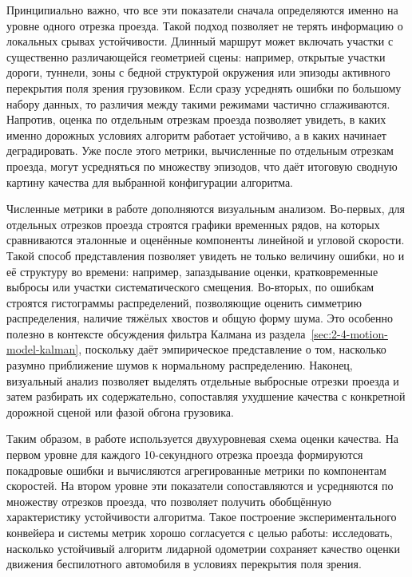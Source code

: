 Принципиально важно, что все эти показатели сначала определяются именно на уровне одного отрезка проезда. Такой подход позволяет не терять информацию о локальных срывах устойчивости. Длинный маршрут может включать участки с существенно различающейся геометрией сцены: например, открытые участки дороги, туннели, зоны с бедной структурой окружения или эпизоды активного перекрытия поля зрения грузовиком. Если сразу усреднять ошибки по большому набору данных, то различия между такими режимами частично сглаживаются. Напротив, оценка по отдельным отрезкам проезда позволяет увидеть, в каких именно дорожных условиях алгоритм работает устойчиво, а в каких начинает деградировать. Уже после этого метрики, вычисленные по отдельным отрезкам проезда, могут усредняться по множеству эпизодов, что даёт итоговую сводную картину качества для выбранной конфигурации алгоритма.

Численные метрики в работе дополняются визуальным анализом. Во-первых, для отдельных отрезков проезда строятся графики временных рядов, на которых сравниваются эталонные и оценённые компоненты линейной и угловой скорости. Такой способ представления позволяет увидеть не только величину ошибки, но и её структуру во времени: например, запаздывание оценки, кратковременные выбросы или участки систематического смещения. Во-вторых, по ошибкам строятся гистограммы распределений, позволяющие оценить симметрию распределения, наличие тяжёлых хвостов и общую форму шума. Это особенно полезно в контексте обсуждения фильтра Калмана из раздела~\ref{sec:2-4-motion-model-kalman}, поскольку даёт эмпирическое представление о том, насколько разумно приближение шумов к нормальному распределению. Наконец, визуальный анализ позволяет выделять отдельные выбросные отрезки проезда и затем разбирать их содержательно, сопоставляя ухудшение качества с конкретной дорожной сценой или фазой обгона грузовика.

Таким образом, в работе используется двухуровневая схема оценки качества. На первом уровне для каждого 10-секундного отрезка проезда формируются покадровые ошибки и вычисляются агрегированные метрики по компонентам скоростей. На втором уровне эти показатели сопоставляются и усредняются по множеству отрезков проезда, что позволяет получить обобщённую характеристику устойчивости алгоритма. Такое построение экспериментального конвейера и системы метрик хорошо согласуется с целью работы: исследовать, насколько устойчивый алгоритм лидарной одометрии сохраняет качество оценки движения беспилотного автомобиля в условиях перекрытия поля зрения.
